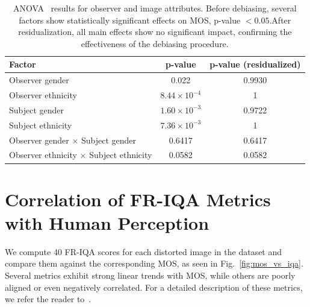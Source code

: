 \begin{table}
    \centering
    \caption{ANOVA~\cite{ross2017one} results for observer and image attributes. Before debiasing, several factors show statistically significant effects on MOS, p-value $< 0.05$.\@ After residualization, all main effects show no significant impact, confirming the effectiveness of the debiasing procedure.}\label{tab:anova}
    \begin{tabular}{lcc}
        \hline %
        Factor & p-value & p-value (residualized) \\
        \hline %
        Observer gender                             & 0.022                 & 0.9930 \\
        Observer ethnicity                          & $8.44 \times 10^{-4}$ & 1 \\
        Subject gender                              & $1.60 \times 10^{-3}$ & 0.9722 \\
        Subject ethnicity                           & $7.36 \times 10^{-3}$ & 1 \\
        Observer gender $\times$ Subject gender     & 0.6417              & 0.6417 \\
        Observer ethnicity $\times$ Subject ethnicity & 0.0582              & 0.0582 \\
        \hline %
    \end{tabular}
\end{table}

\section{Correlation of FR-IQA Metrics with Human Perception}

We compute 40 FR-IQA scores for each distorted image in the dataset and compare them against the corresponding MOS, as seen in Fig.~\ref{fig:mos_vs_iqa}. Several metrics exhibit strong linear trends with MOS, while others are poorly aligned or even negatively correlated. For a detailed description of these metrics, we refer the reader to~\cite{shahrukh2019survey}.



